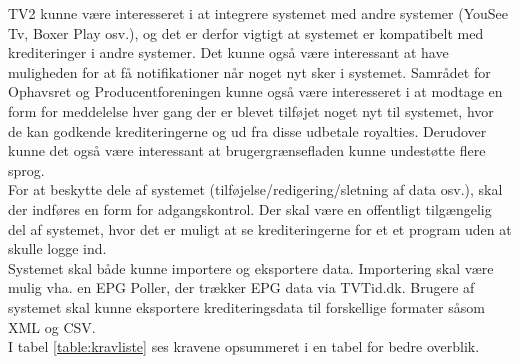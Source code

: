 TV2 kunne være interesseret i at integrere systemet med andre systemer (YouSee Tv, Boxer Play osv.), og det er derfor vigtigt at systemet er kompatibelt med krediteringer i andre systemer. Det kunne også være interessant at have muligheden for at få notifikationer når noget nyt sker i systemet. Samrådet for Ophavsret og Producentforeningen kunne også være interesseret i at modtage en form for meddelelse hver gang der er blevet tilføjet noget nyt til systemet, hvor de kan godkende krediteringerne og ud fra disse udbetale royalties. Derudover kunne det også være interessant at brugergrænsefladen kunne undestøtte flere sprog.\\


For at beskytte dele af systemet (tilføjelse/redigering/sletning af data osv.), skal der indføres en form for adgangskontrol. Der skal være en offentligt tilgængelig del af systemet, hvor det er muligt at se krediteringerne for et et program uden at skulle logge ind.\\


Systemet skal både kunne importere og eksportere data. Importering skal være mulig vha. en EPG Poller, der trækker EPG data via TVTid.dk. Brugere af systemet skal kunne eksportere krediteringsdata til forskellige formater såsom XML og CSV.\\


I tabel \ref{table:kravliste} ses kravene opsummeret i en tabel for bedre overblik.

